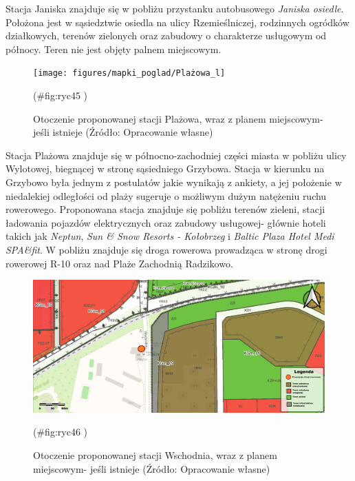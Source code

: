 \documentclass{amuthesis}
\begin{document}
Stacja Janiska znajduje się w pobliżu przystanku autobusowego \emph{Janiska osiedle}. Położona jest w sąsiedztwie osiedla na ulicy Rzemieślniczej, rodzinnych ogródków działkowych, terenów zielonych oraz zabudowy o charakterze usługowym od północy. Teren nie jest objęty palnem miejscowym.

\begin{figure}[t]

{\centering \texttt{[image: figures/mapki\_poglad/Plażowa\_l]} 

}

\caption{Otoczenie proponowanej stacji Plażowa, wraz z planem miejscowym- jeśli istnieje (Źródło: Opracowanie własne)}(\#fig:ryc45 )
\end{figure}

Stacja Plażowa znajduje się w północno-zachodniej części miasta w pobliżu ulicy Wylotowej, biegnącej w stronę sąsiedniego Grzybowa.
Stacja w kierunku na Grzybowo była jednym z postulatów jakie wynikają z ankiety, a jej położenie w niedalekiej odległości od plaży sugeruje o możliwym dużym natężeniu ruchu rowerowego.
Proponowana stacja znajduje się pobliżu terenów zieleni, stacji ładowania pojazdów elektrycznych oraz zabudowy usługowej- głównie hoteli takich jak \emph{Neptun}, \emph{Sun \& Snow Resorts - Kołobrzeg} i \emph{Baltic Plaza Hotel Medi SPA\&fit}.
W pobliżu znajduje się droga rowerowa prowadząca w stronę drogi rowerowej R-10 oraz nad Plaże Zachodnią Radzikowo.

\begin{figure}[t]

{\centering \includegraphics[width=1.05\linewidth]{figures/mapki_poglad/Wschodnia_l} 

}

\caption{Otoczenie proponowanej stacji Wschodnia, wraz z planem miejscowym- jeśli istnieje (Źródło: Opracowanie własne)}(\#fig:ryc46 )
\end{figure}
\end{document}
